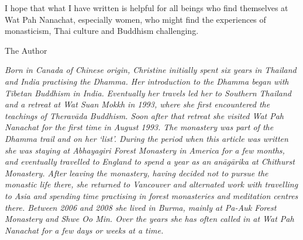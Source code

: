 I hope that what I have written is helpful for all beings who find
themselves at Wat Pah Nanachat, especially women, who might find the
experiences of monasticism, Thai culture and Buddhism challenging.

The Author

\emph{Born in Canada of Chinese origin, Christine initially spent six
years in Thailand and India practising the Dhamma. Her introduction to
the Dhamma began with Tibetan Buddhism in India. Eventually her travels
led her to Southern Thailand and a retreat at Wat Suan Mokkh in 1993,
where she first encountered the teachings of Theravāda Buddhism. Soon
after that retreat she visited Wat Pah Nanachat for the first time in
August 1993. The monastery was part of the Dhamma trail and on her
`list'. During the period when this article was written she was staying
at Abhayagiri Forest Monastery in America for a few months, and
eventually travelled to England to spend a year as an anāgārika at
Chithurst Monastery. After leaving the monastery, having decided not to
pursue the monastic life there, she returned to Vancouver and alternated
work with travelling to Asia and spending time practising in forest
monasteries and meditation centres there. Between 2006 and 2008 she
lived in Burma, mainly at Pa-Auk Forest Monastery and Shwe Oo Min. Over
the years she has often called in at Wat Pah Nanachat for a few days or
weeks at a time.}

